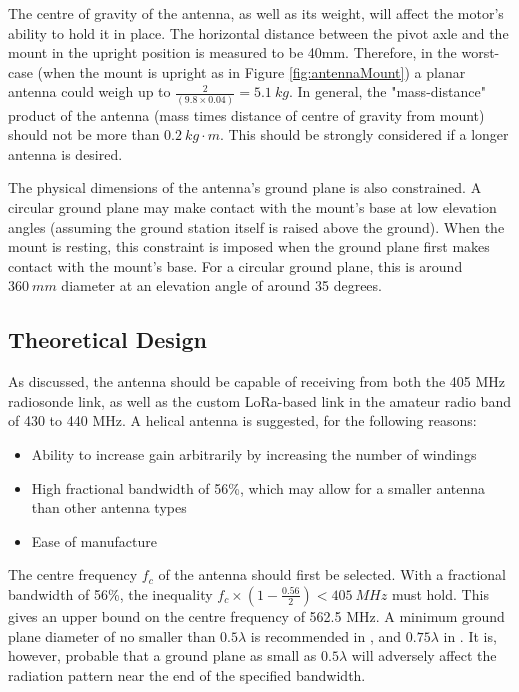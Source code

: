 The centre of gravity of the antenna, as well as its weight, will affect the motor's ability to hold it in place. The horizontal distance between the pivot axle and the mount in the upright position is measured to be 40mm. Therefore, in the worst-case (when the mount is upright as in Figure \ref{fig:antennaMount}) a planar antenna could weigh up to $\frac{2}{(9.8 \times 0.04)} = \SI{5.1}{kg}$. In general, the "mass-distance" product of the antenna (mass times distance of centre of gravity from mount) should not be more than $\SI{0.2}{kg \cdot m}$. This should be strongly considered if a longer antenna is desired.

The physical dimensions of the antenna's ground plane is also constrained. A circular ground plane may make contact with the mount's base at low elevation angles (assuming the ground station itself is raised above the ground). When the mount is resting, this constraint is imposed when the ground plane first makes contact with the mount's base. For a circular ground plane, this is around $\SI{360}{mm}$ diameter at an elevation angle of around 35 degrees.

\subsection{Theoretical Design}
As discussed, the antenna should be capable of receiving from both the 405 MHz radiosonde link, as well as the custom LoRa-based link in the amateur radio band of 430 to 440 MHz. A helical antenna is suggested, for the following reasons:
\begin{itemize}
    \item Ability to increase gain arbitrarily by increasing the number of windings
    \item High fractional bandwidth of 56\%, which may allow for a smaller antenna than other antenna types
    \item Ease of manufacture
\end{itemize}

The centre frequency $f_c$ of the antenna should first be selected. With a fractional bandwidth of 56\%, the inequality $f_c \times (1 - \frac{0.56}{2}) < \SI{405}{MHz}$ must hold. This gives an upper bound on the centre frequency of 562.5 MHz. A minimum ground plane diameter of no smaller than $0.5 \lambda$ is recommended in \cite{textbook-antennaTheoryAnalysisDesign}, and $0.75 \lambda$ in \cite{textbook-helicalAntenna}. It is, however, probable that a ground plane as small as $0.5 \lambda$ will adversely affect the radiation pattern near the end of the specified bandwidth.

